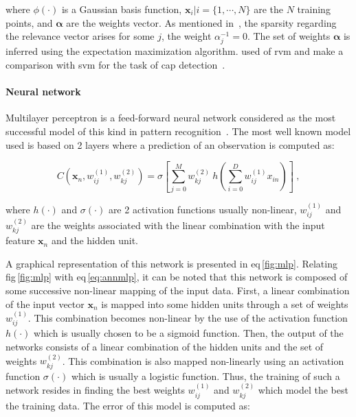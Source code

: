 \noindent where $\phi(\cdot)$ is a Gaussian basis function, $\mathbf{x}_i|i=\{1,\cdots,N\}$ are the $N$ training points, and $\boldsymbol{\alpha}$ are the weights vector.
As mentioned in~\cite{Quinonero-Candela2002}, the sparsity regarding the relevance vector arises for some $j$, the weight $\alpha_j^{-1} = 0$.
The set of weights $\boldsymbol{\alpha}$ is inferred using the expectation maximization algorithm.
\citeauthor{Ozer2010} used of \ac{rvm} and make a comparison with \ac{svm} for the task of \ac{cap} detection~\cite{Ozer2009,Ozer2010}.

\paragraph{Neural network} 
Multilayer perceptron is a feed-forward neural network considered as the most successful model of this kind in pattern recognition~\cite{Bishop2006}.
The most well known model used is based on 2 layers where a prediction of an observation is computed as:

\begin{equation}
	C(\mathbf{x}_n,w_{ij}^{(1)},w_{kj}^{(2)}) = \sigma \left[ \sum_{j=0}^{M} w_{kj}^{(2)} \  h \left( \sum_{i=0}^{D} w_{ij}^{(1)} x_{in} \right) \right] \ ,
	\label{eq:annmlp}
\end{equation}

\noindent where $h(\cdot)$ and $\sigma(\cdot)$ are 2 activation functions usually non-linear, $w_{ij}^{(1)}$ and $ w_{kj}^{(2)}$ are the weights associated with the linear combination with the input feature $\mathbf{x}_n$ and the hidden unit.



A graphical representation of this network is presented in \acs{eq}\,\ref{fig:mlp}.
Relating \acs{fig}\,\ref{fig:mlp} with \acs{eq}\,\eqref{eq:annmlp}, it can be noted that this network is composed of some successive non-linear mapping of the input data.
First, a linear combination of the input vector $\mathbf{x}_n$ is mapped into some hidden units through a set of weights $w_{ij}^{(1)}$.
This combination becomes non-linear by the use of the activation function $h(\cdot)$ which is usually chosen to be a sigmoid function.
Then, the output of the networks consists of a linear combination of the hidden units and the set of weights $w_{kj}^{(2)}$.
This combination is also mapped non-linearly using an activation function $\sigma(\cdot)$ which is usually a logistic function.
Thus, the training of such a network resides in finding the best weights $w_{ij}^{(1)}$ and $ w_{kj}^{(2)}$ which model the best the training data.
The error of this model is computed as:


